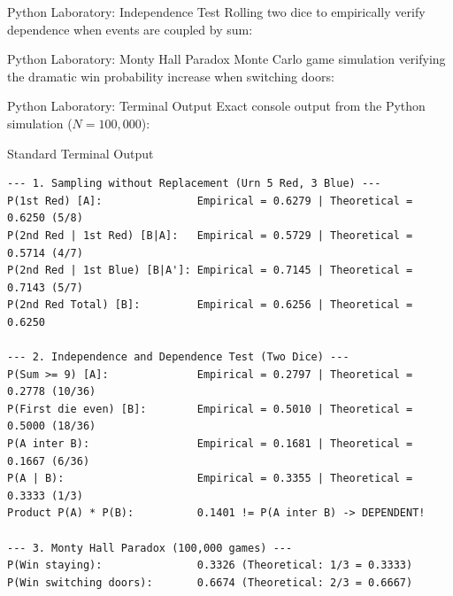 \documentclass[10pt,aspectratio=169]{beamer}
\begin{document}
\begin{frame}[fragile]{Python Laboratory: Independence Test}
  Rolling two dice to empirically verify dependence when events are coupled by sum:
  \vspace{0.2em}
  {
  }
\end{frame}

\begin{frame}[fragile]{Python Laboratory: Monty Hall Paradox}
  Monte Carlo game simulation verifying the dramatic win probability increase when switching doors:
  \vspace{0.2em}
  {
  }
\end{frame}

\begin{frame}[fragile]{Python Laboratory: Terminal Output}
  Exact console output from the Python simulation ($N = 100,000$):
  \vspace{0.2em}
  \begin{block}{Standard Terminal Output}
    \fontsize{6.0pt}{7.0pt}\selectfont
    \begin{verbatim}
--- 1. Sampling without Replacement (Urn 5 Red, 3 Blue) ---
P(1st Red) [A]:               Empirical = 0.6279 | Theoretical = 0.6250 (5/8)
P(2nd Red | 1st Red) [B|A]:   Empirical = 0.5729 | Theoretical = 0.5714 (4/7)
P(2nd Red | 1st Blue) [B|A']: Empirical = 0.7145 | Theoretical = 0.7143 (5/7)
P(2nd Red Total) [B]:         Empirical = 0.6256 | Theoretical = 0.6250

--- 2. Independence and Dependence Test (Two Dice) ---
P(Sum >= 9) [A]:              Empirical = 0.2797 | Theoretical = 0.2778 (10/36)
P(First die even) [B]:        Empirical = 0.5010 | Theoretical = 0.5000 (18/36)
P(A inter B):                 Empirical = 0.1681 | Theoretical = 0.1667 (6/36)
P(A | B):                     Empirical = 0.3355 | Theoretical = 0.3333 (1/3)
Product P(A) * P(B):          0.1401 != P(A inter B) -> DEPENDENT!

--- 3. Monty Hall Paradox (100,000 games) ---
P(Win staying):               0.3326 (Theoretical: 1/3 = 0.3333)
P(Win switching doors):       0.6674 (Theoretical: 2/3 = 0.6667)
    \end{verbatim}
  \end{block}
\end{frame}
\end{document}
